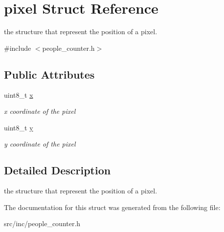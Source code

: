 \hypertarget{structpixel}{}\section{pixel Struct Reference}
\label{structpixel}


the structure that represent the position of a pixel.  




{\ttfamily \#include $<$people\+\_\+counter.\+h$>$}

\subsection*{Public Attributes}
\begin{DoxyCompactItemize}
\item 
\mbox{\label{structpixel_ae5db5c1abe80af4f592b6aea94ff29d3}} 
uint8\+\_\+t \mbox{\hyperlink{structpixel_ae5db5c1abe80af4f592b6aea94ff29d3}{x}}
\begin{DoxyCompactList}\small\item\em x coordinate of the pixel \end{DoxyCompactList}\item 
\mbox{\label{structpixel_abf410983da3b0dc7caf8b4b769856dbe}} 
uint8\+\_\+t \mbox{\hyperlink{structpixel_abf410983da3b0dc7caf8b4b769856dbe}{y}}
\begin{DoxyCompactList}\small\item\em y coordinate of the pixel \end{DoxyCompactList}\end{DoxyCompactItemize}


\subsection{Detailed Description}
the structure that represent the position of a pixel. 

The documentation for this struct was generated from the following file\+:\begin{DoxyCompactItemize}
\item 
src/inc/people\+\_\+counter.\+h\end{DoxyCompactItemize}
